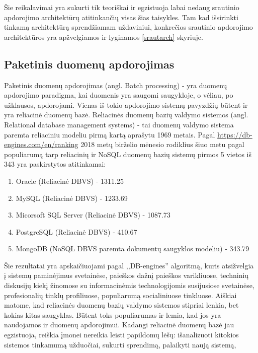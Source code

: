 \documentclass{VUMIFPSkursinis}
\begin{document}
        Šie reikalavimai yra sukurti tik teoriškai ir egzistuoja labai nedaug srautinio apdorojimo architektūrų atitinkančių visas šias taisykles. Tam kad išsirinkti tinkamą architektūrą sprendžiamam uždaviniui, 
        konkrečios srautinio apdorojimo architektūros yra apžvelgiamos ir lyginamos \ref{srautarch} skyriuje.

\subsection{Paketinis duomenų apdorojimas}
    Paketinis duomenų apdorojimas (angl. Batch processing) - yra duomenų apdorojimo paradigma, kai duomenis yra saugomi saugykloje, o vėliau, po užklausos, apdorojami.
    Vienas iš tokio apdorojimo sistemų pavyzdžių būtent ir yra reliacinė duomenų bazė. Reliacinės duomenų bazių valdymo sistemos (angl. Relational database management systems) - tai 
    duomenų valdymo sistema paremta reliaciniu modeliu pirmą kartą aprašytu 1969 metais\cite{codd1969derivability}.
    Pagal \url{https://db-engines.com/en/ranking} 2018 metų birželio mėnesio rodiklius šiuo metu pagal populiarumą tarp reliacinių ir NoSQL duomenų bazių sistemų pirmos 5 vietos iš 343 yra paskirstytos atitinkamai:
    \begin{enumerate}
        \item Oracle (Reliacinė DBVS) - 1311.25
        \item MySQL (Reliacinė DBVS) - 1233.69
        \item Micorsoft SQL Server (Reliacinė DBVS) - 1087.73
        \item PostgreSQL (Reliacinė DBVS) - 410.67
        \item MongoDB (NoSQL DBVS paremta dokumentų saugyklos modeliu) - 343.79
    \end{enumerate}\par
        Šie rezultatai yra apskaičiuojami pagal ,,DB-engines'' algoritmą, kuris atsižvelgia į sistemų paminėjimus svetainėse, paieškos dažnį paieškos varikliuose, techninių diskusijų kiekį
       žinomose su informacinėmis technologijomis susijusiose svetainėse, profesionalių tinklų profiliuose, populiarumą socialiniuose tinkluose\cite{dbengines}. Aiškiai matome, kad reliacinės
    duomenų bazių valdymo sistemos stipriai lenkia, bet kokias kitas saugyklas. Būtent toks populiarumas ir lemia, kad jos yra naudojamos ir duomenų apdorojimui. Kadangi reliacinė
    duomenų bazė jau egzistuoja, reiškia įmonei nereikia leisti papildomų lėšų: išanalizuoti kitokios sistemos tinkamumą užduočiai, sukurti sprendimą, palaikyti naują sistemą, 
\end{document}
